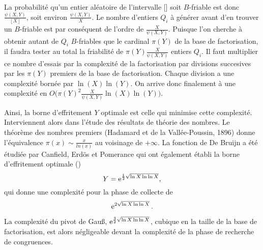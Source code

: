 La probabilité qu'un entier aléatoire de l'intervalle [\![1, X]\!] soit 
$B$-friable est donc $\frac{\psi (X,Y)}{\left\lfloor X \right\rfloor}$, soit
environ $\frac{\psi (X,Y)}{X}$. Le nombre d'entiers $Q_i$ à générer avant d'en 
trouver un $B$-friable est par conséquent de l'ordre de $\frac{X}{\psi(X,Y)}$.
Puisque l'on cherche à obtenir autant de $Q_i$ $B$-friables que le cardinal 
$\pi(Y)$ de la base de factorisation, il faudra tester au total la friabilité
de $\pi(Y)\frac{X}{\psi(X,Y)}$ entiers $Q_i$. Il faut multiplier ce nombre 
d'essais par la complexité de la factorisation par divisions succesives par 
les $\pi(Y)$ premiers de la base de factorisation. Chaque division a une 
complexité bornée par $\ln(X)\ln(Y)$. On arrive donc finalement à une complexité
en $O\big(\pi(Y)^2 \frac{X}{\psi(X,Y)} \ln(X)\ln(Y)\big)$.

Ainsi, la borne d'effritement $Y$ optimale est celle qui minimise cette 
complexité. Interviennent alors dans l'étude des résultats de théorie des 
nombres. Le théorème des nombres premiers (Hadamard et de la
Vallée-Poussin, 1896) donne l'équivalence $\pi(x) \sim \frac{x}{ln(x)}$ au 
voisinage de $+ \infty$. La fonction de De Bruijn a été étudiée par Canfield, 
Erdös et Pomerance qui ont également établi la borne d'effritement optimale
(\cite{Tale})
\[ Y = \operatorname{e}^{\frac{1}{2} \sqrt{\ln X \ln \ln X}},\] qui donne une complexité 
pour la phase de collecte de \[ \operatorname{e}^{2 \sqrt{\ln X \ln \ln X}}.\] 

La complexité du pivot de Gau\ss{}, $\operatorname{e}^{\frac{3}{2} \sqrt{\ln X \ln \ln X}}$,
cubique en la taille de la base de factorisation, est alors négligeable devant 
la complexité de la phase de recherche de congruences.
